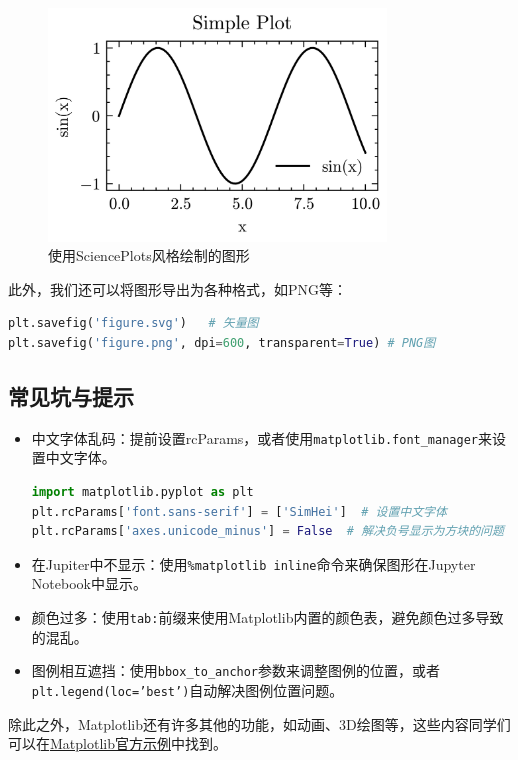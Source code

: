 \documentclass[../main.tex]{subfiles}
\begin{document}
\begin{figure}[htbp]
    \centering
    \includegraphics[width=0.8\textwidth]{images/plt/Figure_5.png}
    \caption{使用SciencePlots风格绘制的图形}
\end{figure}

此外，我们还可以将图形导出为各种格式，如PNG等：
\begin{lstlisting}[language=python]
plt.savefig('figure.svg')   # 矢量图
plt.savefig('figure.png', dpi=600, transparent=True) # PNG图    
\end{lstlisting}

\subsection{常见坑与提示}

\begin{itemize}
    \item 中文字体乱码：提前设置rcParams，或者使用\texttt{matplotlib.font\_manager}来设置中文字体。
    \begin{lstlisting}[language=python]
import matplotlib.pyplot as plt
plt.rcParams['font.sans-serif'] = ['SimHei']  # 设置中文字体
plt.rcParams['axes.unicode_minus'] = False  # 解决负号显示为方块的问题
    \end{lstlisting}
    \item 在Jupiter中不显示：使用\texttt{\%matplotlib inline}命令来确保图形在Jupyter Notebook中显示。
    \item 颜色过多：使用\texttt{tab:}前缀来使用Matplotlib内置的颜色表，避免颜色过多导致的混乱。
    \item 图例相互遮挡：使用\texttt{bbox\_to\_anchor}参数来调整图例的位置，或者\texttt{plt.legend(loc='best')}自动解决图例位置问题。
\end{itemize}

除此之外，Matplotlib还有许多其他的功能，如动画、3D绘图等，这些内容同学们可以在\href{https://matplotlib.org/stable/gallery/index.html}{Matplotlib官方示例}中找到。
\end{document}
